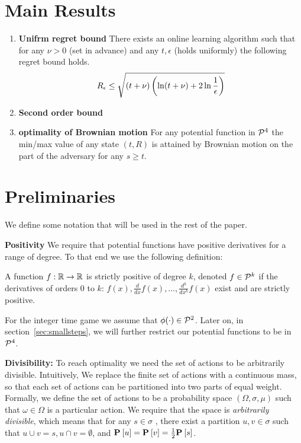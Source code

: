 \documentclass{article}[12pt]
\begin{document}
\section{Main Results}
\begin{enumerate}
\item {\bf Unifrm regret bound} There exists an online learning
  algorithm such that for any $\nu>0$ (set in advance) and any
  $t,\epsilon$ (holds uniformly) the following regret bound holds.
  \begin{equation}
\R_\epsilon \leq \sqrt{(t+\nu) \left( \ln (t+\nu) + 2 \ln \frac{1}{\epsilon}\right)}
\end{equation} 
\item {\bf Second order bound}
\item {\bf optimality of Brownian motion} For any potential function
  in $\SP{4}$ the min/max value of any state $(t,R)$ is attained by
  Brownian motion on the part of the adversary for any $s\geq t$.
\end{enumerate}


\section{Preliminaries} \label{sec:preliminaries}

We define some notation that will be used in the rest of the paper.

{\bf Positivity}
We require that potential functions have positive derivatives for a
range of degree. To that end we use the following definition:
\begin{definition}
A function $f:\reals \to \reals$ is strictly positive of degree $k$, 
denoted $f \in \SP{k}$ if the derivatives of orders 0 to $k$:  
$f(x), \frac{d}{dx}f(x), \ldots, \frac{d^k}{dx^k}f(x)$ exist and are strictly positive.
\end{definition}
For the integer time game we assume that $\pot(\cdot) \in
\SP{2}$. Later on, in section~\ref{sec:smallsteps}, we will further
restrict our potential functions to be in $\SP{4}$.

{\bf Divisibility:} To reach optimality we need the set of actions to
be arbitrarily divisible. Intuitively, We replace the finite set of
actions with a continuous mass, so that each set of actions can be
partitioned into two parts of equal weight.  Formally, we define the
set of actions to be a probability space $(\Omega,\sigma,\mu)$ such
that $\omega \in \Omega$ is a particular action. We require that the
space is {\em arbitrarily divisible}, which means that for any
$s \in \sigma$ , there exist a partition $u,v \in \sigma$ such that
$u \cup v = s, u \cap v = \emptyset$, and
$\P{}{u}=\P{}{v}=\frac{1}{2} \P{}{s}$.
\end{document}
